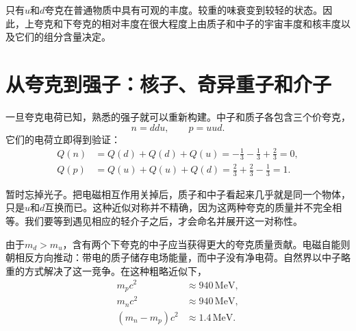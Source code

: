 \begin{classroomqa}
\end{classroomqa}

只有\(u\)和\(d\)夸克在普通物质中具有可观的丰度。较重的味衰变到较轻的状态。因此，上夸克和下夸克的相对丰度在很大程度上由质子和中子的宇宙丰度和核丰度以及它们的组分含量决定。

\begin{classroomqa}
\end{classroomqa}

\section{从夸克到强子：核子、奇异重子和介子}

一旦夸克电荷已知，熟悉的强子就可以重新构建。中子和质子各包含三个价夸克，
\begin{equation}
n=ddu,
\qquad
p=uud.
\end{equation}
它们的电荷立即得到验证：
\begin{align}
Q(n) &= Q(d)+Q(d)+Q(u)
= -\frac13-\frac13+\frac23
=0,\\
Q(p) &= Q(u)+Q(u)+Q(d)
= \frac23+\frac23-\frac13
=1.
\end{align}

暂时忘掉光子。把电磁相互作用关掉后，质子和中子看起来几乎就是同一个物体，只是\(u\)和\(d\)互换而已。这种近似对称并不精确，因为这两种夸克的质量并不完全相等。我们要等到遇见相应的轻介子之后，才会命名并展开这一对称性。

由于\(m_d>m_u\)，含有两个下夸克的中子应当获得更大的夸克质量贡献。电磁自能则朝相反方向推动：带电的质子储存电场能量，而中子没有净电荷。自然界以中子略重的方式解决了这一竞争。在这种粗略近似下，
\begin{align}
m_pc^2&\approx940\,\mathrm{MeV},\\
m_nc^2&\approx940\,\mathrm{MeV},\\
(m_n-m_p)c^2&\approx1.4\,\mathrm{MeV}.
\end{align}

